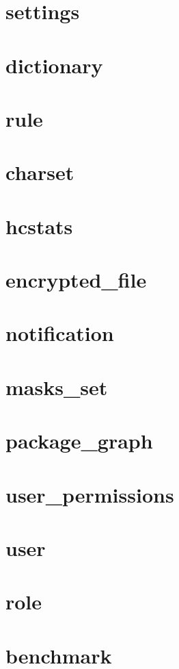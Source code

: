 \documentclass[slovak]{fitthesis}
\begin{document}
\section{settings}


\section{dictionary}


\section{rule}


\section{charset}


\section{hcstats}


\section{encrypted\_file}


\section{notification}


\section{masks\_set}


\section{package\_graph}


\section{user\_permissions}


\section{user}


\section{role}


\section{benchmark}



  
  
\end{document}
